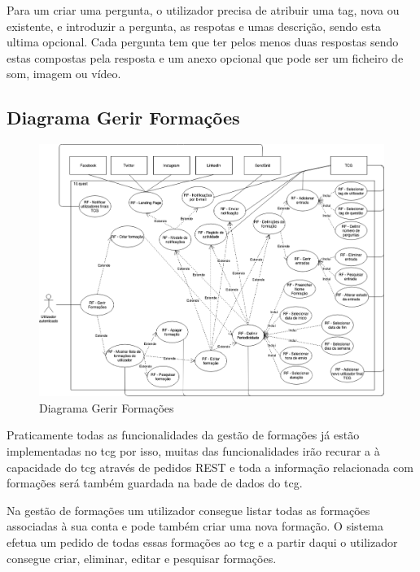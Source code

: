 Para um criar uma pergunta, o utilizador precisa de atribuir uma tag, nova ou existente, e introduzir a pergunta, as respotas e umas descrição, sendo esta ultima opcional. Cada pergunta tem que ter pelos menos duas respostas sendo estas compostas pela resposta e um anexo opcional que pode ser um ficheiro de som, imagem ou vídeo.



\newpage

\subsection{Diagrama Gerir Formações}
\label{d:formacoes}
\begin{figure}[ht!]
	\begin{center}
		\includegraphics[width=1\textwidth]{img/rf/gerir-formacoes}
		\caption{Diagrama Gerir Formações}
		\label{fig:rf-gerir-formacoes}
	\end{center}
\end{figure}

Praticamente todas as funcionalidades da gestão de formações já estão implementadas no \acrshort{tcg} por isso, muitas das funcionalidades irão recurar a à capacidade do \acrshort{tcg} através de pedidos REST e toda a informação relacionada com formações será também guardada na bade de dados do \acrshort{tcg}.

Na gestão de formações um utilizador consegue listar todas as formações associadas à sua conta e pode também criar uma nova formação. O sistema efetua um pedido de todas essas formações ao \acrshort{tcg} e a partir daqui o utilizador consegue criar, eliminar, editar e pesquisar formações.

